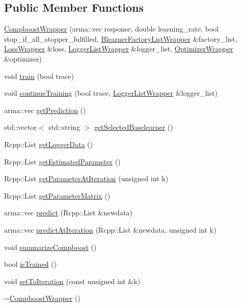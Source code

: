 \subsection*{Public Member Functions}
\begin{DoxyCompactItemize}
\item 
\mbox{\hyperlink{class_compboost_wrapper_a5c2f3c21c22aea08b042d91072f43707}{Compboost\+Wrapper}} (arma\+::vec response, double learning\+\_\+rate, bool stop\+\_\+if\+\_\+all\+\_\+stopper\+\_\+fulfilled, \mbox{\hyperlink{class_blearner_factory_list_wrapper}{Blearner\+Factory\+List\+Wrapper}} \&factory\+\_\+list, \mbox{\hyperlink{class_loss_wrapper}{Loss\+Wrapper}} \&loss, \mbox{\hyperlink{class_logger_list_wrapper}{Logger\+List\+Wrapper}} \&logger\+\_\+list, \mbox{\hyperlink{class_optimizer_wrapper}{Optimizer\+Wrapper}} \&optimizer)
\item 
void \mbox{\hyperlink{class_compboost_wrapper_a361e455353ee08273d41ed7b8350881d}{train}} (bool trace)
\item 
void \mbox{\hyperlink{class_compboost_wrapper_afd9b7f389a02a13c72a7e9a834594c73}{continue\+Training}} (bool trace, \mbox{\hyperlink{class_logger_list_wrapper}{Logger\+List\+Wrapper}} \&logger\+\_\+list)
\item 
arma\+::vec \mbox{\hyperlink{class_compboost_wrapper_ad0340d006f55b3278b670363ad90d545}{get\+Prediction}} ()
\item 
std\+::vector$<$ std\+::string $>$ \mbox{\hyperlink{class_compboost_wrapper_aa5313de3cf62b93286a67f266b605443}{get\+Selected\+Baselearner}} ()
\item 
Rcpp\+::\+List \mbox{\hyperlink{class_compboost_wrapper_a3175f9dd0d66d042eb5bb9cab859e086}{get\+Logger\+Data}} ()
\item 
Rcpp\+::\+List \mbox{\hyperlink{class_compboost_wrapper_ad31a5a5e70ceee981a14834a8fd52a68}{get\+Estimated\+Parameter}} ()
\item 
Rcpp\+::\+List \mbox{\hyperlink{class_compboost_wrapper_ac5d5d21932a27b470abbfb0fd55a75ec}{get\+Parameter\+At\+Iteration}} (unsigned int k)
\item 
Rcpp\+::\+List \mbox{\hyperlink{class_compboost_wrapper_a1ffa4829c1c8ce639049271f44823f94}{get\+Parameter\+Matrix}} ()
\item 
arma\+::vec \mbox{\hyperlink{class_compboost_wrapper_a62637fbc8c50160b411b817b7e99432e}{predict}} (Rcpp\+::\+List \&newdata)
\item 
arma\+::vec \mbox{\hyperlink{class_compboost_wrapper_a72b9c303a13fb3f6f8346c0af0796496}{predict\+At\+Iteration}} (Rcpp\+::\+List \&newdata, unsigned int k)
\item 
void \mbox{\hyperlink{class_compboost_wrapper_aa656658dec0c8396f4bea7c4049ed264}{summarize\+Compboost}} ()
\item 
bool \mbox{\hyperlink{class_compboost_wrapper_a0e12eb55444c9333fdc1ee1696483f6d}{is\+Trained}} ()
\item 
void \mbox{\hyperlink{class_compboost_wrapper_a3f8ebe1d821b3bfa5e6d0d04beff0211}{set\+To\+Iteration}} (const unsigned int \&k)
\item 
\mbox{\hyperlink{class_compboost_wrapper_a0376c00d5b68a206a1d5ecfc13a085b1}{$\sim$\+Compboost\+Wrapper}} ()
\end{DoxyCompactItemize}
